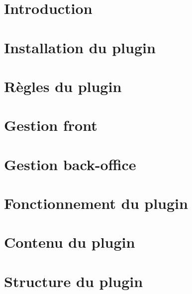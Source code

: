 

\section{Introduction} \label{section:introduction}


\newpage

\section{Installation du plugin} \label{section:introduction}



\section{Règles du plugin} \label{section:regles}


\newpage

\section{Gestion front} \label{section:front-office}


\newpage

\section{Gestion back-office} \label{section:back-office}


\newpage

\section{Fonctionnement du plugin} \label{section:fonctionnement}


\newpage

\section{Contenu du plugin} \label{section:contenu}


\newpage

\section{Structure du plugin} \label{section:structure}





